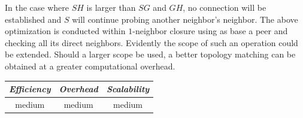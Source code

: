 In the case where $SH$ is larger than $SG$ and
$GH$, no connection will be established and $S$ will continue probing another
neighbor's neighbor. 
The above optimization is conducted within $1$-neighbor
closure using as base a peer and checking all its direct neighbors.
Evidently the scope of such an operation could be extended.
Should  a larger scope be used, a better topology matching can be obtained 
at a greater computational overhead.
%
%
%

\begin{center}
{\footnotesize
\begin{tabular}{ccc}
\emph{Efficiency} & \emph{Overhead} & \emph{Scalability} \\
\hline
medium &
medium &
medium
\end{tabular}
}
\end{center}

